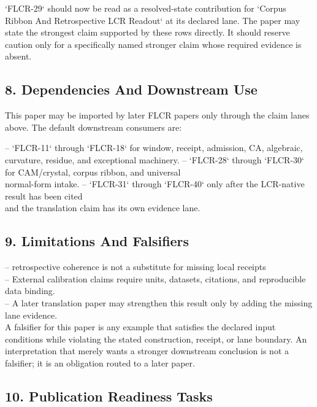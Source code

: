 \documentclass[11pt]{article}
\begin{document}
`FLCR-29` should now be read as a resolved-state contribution for `Corpus Ribbon And Retrospective LCR Readout` at its declared lane. The paper may state the strongest claim supported by these rows directly. It should reserve caution only for a specifically named stronger claim whose required evidence is absent.

\subsection*{8. Dependencies And Downstream Use}

This paper may be imported by later FLCR papers only through the claim lanes
above. The default downstream consumers are:

\noindent{}-- `FLCR-11` through `FLCR-18` for window, receipt, admission, CA, algebraic,\\
  curvature, residue, and exceptional machinery.
\noindent{}-- `FLCR-28` through `FLCR-30` for CAM/crystal, corpus ribbon, and universal\\
  normal-form intake.
\noindent{}-- `FLCR-31` through `FLCR-40` only after the LCR-native result has been cited\\
  and the translation claim has its own evidence lane.

\subsection*{9. Limitations And Falsifiers}

\noindent{}-- retrospective coherence is not a substitute for missing local receipts\\
\noindent{}-- External calibration claims require units, datasets, citations, and reproducible data binding.\\
\noindent{}-- A later translation paper may strengthen this result only by adding the missing lane evidence.\\

A falsifier for this paper is any example that satisfies the declared input
conditions while violating the stated construction, receipt, or lane boundary.
An interpretation that merely wants a stronger downstream conclusion is not a
falsifier; it is an obligation routed to a later paper.

\subsection*{10. Publication Readiness Tasks}
\end{document}
